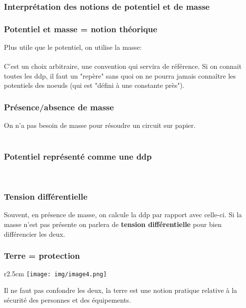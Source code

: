 \subsubsection{Interprétation des notions de potentiel et de masse}
\subsubsection{Potentiel et masse = notion théorique}
Plus utile que le potentiel, on utilise la masse:\\
\ \\

C'est un choix arbitraire, une convention qui servira de référence.
Si on connait toutes les ddp, il faut un "repère" sans quoi on ne pourra jamais connaître les potentiels des noeuds (qui est "défini à une constante près").

\subsubsection{Présence/absence de masse}
On n'a pas besoin de masse pour résoudre un circuit sur papier.\\
\ \\

\subsubsection{Potentiel représenté comme une ddp}
\ \\

\subsubsection{Tension différentielle}
Souvent, en présence de masse, on calcule la ddp par rapport avec celle-ci. Si la masse n'est pas présente on parlera de \textbf{tension différentielle} pour bien différencier les deux.

\subsubsection{Terre = protection}
\begin{wrapfigure}[5]{r}{2.5cm}
\texttt{[image: img/image4.png]}
\end{wrapfigure}
Il ne faut pas confondre les deux, la terre est une notion pratique relative à la sécurité des personnes et des équipements.

